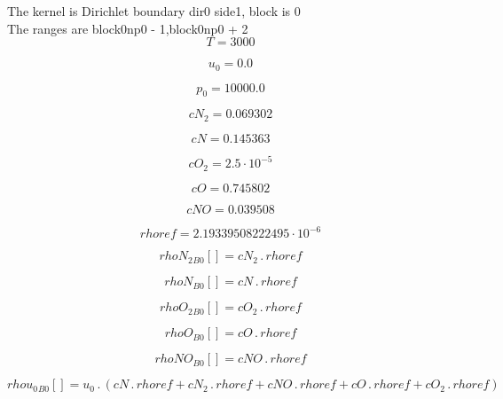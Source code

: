 \documentclass{article}
\begin{document}
\noindent The kernel is Dirichlet boundary dir0 side1, block is 0\\\noindent The ranges are block0np0 - 1,block0np0 + 2\\\begin{dmath}T = 3000\end{dmath}

\begin{dmath}u_{0} = 0.0\end{dmath}

\begin{dmath}p_{0} = 10000.0\end{dmath}

\begin{dmath}cN_{2} = 0.069302\end{dmath}

\begin{dmath}cN = 0.145363\end{dmath}

\begin{dmath}cO_{2} = 2.5 \cdot 10^{-5}\end{dmath}

\begin{dmath}cO = 0.745802\end{dmath}

\begin{dmath}cNO = 0.039508\end{dmath}

\begin{dmath}rhoref = 2.19339508222495 \cdot 10^{-6}\end{dmath}

\begin{dmath}{rhoN_{2}{_{B0}}}[{}] = cN_{2} \,.\, rhoref\end{dmath}

\begin{dmath}{rhoN{_{B0}}}[{}] = cN \,.\, rhoref\end{dmath}

\begin{dmath}{rhoO_{2}{_{B0}}}[{}] = cO_{2} \,.\, rhoref\end{dmath}

\begin{dmath}{rhoO{_{B0}}}[{}] = cO \,.\, rhoref\end{dmath}

\begin{dmath}{rhoNO{_{B0}}}[{}] = cNO \,.\, rhoref\end{dmath}

\begin{dmath}{rhou_{0}{_{B0}}}[{}] = u_{0} \,.\, \left(cN \,.\, rhoref + cN_{2} \,.\, rhoref + cNO \,.\, rhoref + cO \,.\, rhoref + cO_{2} \,.\, rhoref\right)\end{dmath}
\end{document}

